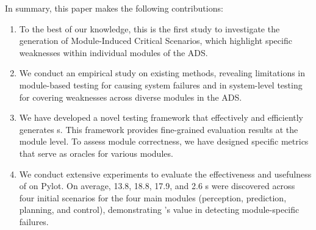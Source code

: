 In summary, this paper makes the following contributions:
\begin{enumerate}[leftmargin=*]

\item To the best of our knowledge, this is the first study to investigate the generation of Module-Induced Critical Scenarios, which highlight specific weaknesses within individual modules of the ADS.

\item We conduct an empirical study on existing methods, revealing limitations in module-based testing for causing system failures and in system-level testing for covering weaknesses across diverse modules in the ADS.

\item We have developed a novel testing framework that effectively and efficiently generates {\mccs}s. This framework provides fine-grained evaluation results at the module level. To assess module correctness, we have designed specific metrics that serve as oracles for various modules.


\item We conduct extensive experiments to evaluate the effectiveness and usefulness of \tool on Pylot. On average, 13.8, 18.8, 17.9, and 2.6 {\mccs}s were discovered across four initial scenarios for the four main modules (perception, prediction, planning, and control), demonstrating \tool's value in detecting module-specific failures.
\end{enumerate}



